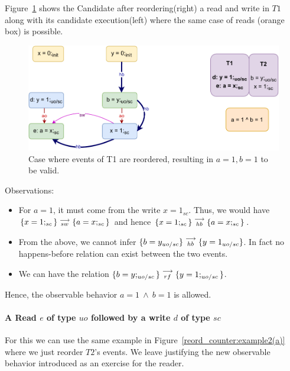         Figure~\ref{reord_counter:example2(b)} shows the Candidate after reordering(right) a read and write in $T1$ along with its candidate execution(left) where the same case of reads (orange box) is possible. 
        \begin{figure}[H]
            \centering
            \includegraphics[scale=0.7]{7.CounterExamples/ReorderingCandidate/Example3R(Rsc-Wuo,sc).pdf}
            \caption{Case where events of T1 are reordered, resulting in $a = 1, b = 1$ to be valid.}
            \label{reord_counter:example2(b)}
        \end{figure}
        
        Observations:
        \begin{itemize}
            \item For $a=1$, it must come from the write $x=1_{sc}$. 
            Thus, we would have $\{x=1;_{sc}\}\stackrel{\longrightarrow}{_{sw}}\{a=x;_{sc}\}$ and hence $\{x=1;_{sc}\}\stackrel{\longrightarrow}{_{hb}}\{a=x;_{sc}\}$.
            \item From the above, we cannot infer $\{b=y_{uo/sc}\}\stackrel{\longrightarrow}{_{hb}}\{y=1_{uo/sc}\}$. In fact no happens-before relation can exist between the two events.
            \item We can have the relation $\{b=y;_{uo/sc}\}\stackrel{\longrightarrow}{_{rf}}\{y=1;_{uo/sc}\}$.
        \end{itemize}
        Hence, the observable behavior $a=1 \ \wedge \ b=1$ is allowed.
    \paragraph{A Read $e$ of type $uo$ followed by a write $d$ of type $sc$}

        For this we can use the same example in Figure~\ref{reord_counter:example2(a)} where we just reorder $T2$'s events.
        We leave justifying the new observable behavior introduced as an exercise for the reader.
    
